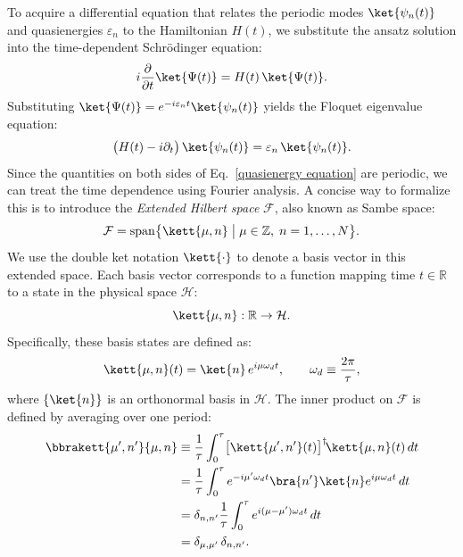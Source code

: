 To acquire a differential equation that relates the periodic modes $\ket{\psi_n(t)}$ and quasienergies $\varepsilon_n$ to the Hamiltonian $H(t)$, we substitute the ansatz solution into the time-dependent Schr\"odinger equation:
\begin{equation}
    i\frac{\partial}{\partial t}\ket{\Psi(t)} = H(t)\,\ket{\Psi(t)}.
\end{equation}
Substituting $\ket{\Psi(t)} = e^{-i\varepsilon_n t} \ket{\psi_n(t)}$ yields the Floquet eigenvalue equation:
\begin{equation}
    \label{quasienergy equation}
    \bigl(H(t)-i\partial_{t}\bigr)\,\ket{\psi_n(t)} = \varepsilon_n\,\ket{\psi_n(t)}.
\end{equation}
Since the quantities on both sides of Eq.~\eqref{quasienergy equation} are periodic, we can treat the time dependence using Fourier analysis. A concise way to formalize this is to introduce the \emph{Extended Hilbert space} $\mathcal{F}$, also known as Sambe space:
\begin{equation}
    \mathcal{F} = \mathrm{span}\bigl\{\kett{\mu,n} \;\big|\; \mu\in\mathbb{Z},\; n=1,\dots,N\bigr\}.
\end{equation}
We use the double ket notation $\kett{\cdot}$ to denote a basis vector in this extended space. Each basis vector corresponds to a function mapping time $t \in \mathbb{R}$ to a state in the physical space $\mathcal{H}$:
\begin{equation}
    \kett{\mu,n} : \mathbb{R} \rightarrow \mathcal{H}.
\end{equation}
Specifically, these basis states are defined as:
\begin{equation}
    \kett{\mu,n}(t) = \ket{n}\,e^{i\mu\omega_d t}, \qquad \omega_d \equiv \frac{2\pi}{\tau},
\end{equation}
where $\{\ket{n}\}$ is an orthonormal basis in $\mathcal{H}$. The inner product on $\mathcal{F}$ is defined by averaging over one period:
\begin{align}
    \bbrakett{\mu',n'}{\mu,n}
    &\equiv \frac{1}{\tau}\int_{0}^{\tau}
    \bigl[\kett{\mu',n'}(t)\bigr]^\dagger \!\kett{\mu,n}(t)\,dt \nonumber\\
    &= \frac{1}{\tau}\int_{0}^{\tau} e^{-i\mu'\omega_d t}\bra{n'}\ket{n}e^{i\mu\omega_d t}\,dt \nonumber\\
    &= \delta_{n,n'} \frac{1}{\tau}\int_{0}^{\tau} e^{i(\mu-\mu')\omega_d t}\,dt \nonumber\\
    &= \delta_{\mu,\mu'}\,\delta_{n,n'}.
\end{align}
